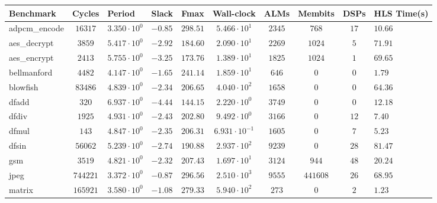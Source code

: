 \begin{tabular}{|l|c|HHc|c|c|c|cH|}
\hline
Benchmark     & Cycles       & Period                 & Slack     & Fmax       & Wall-clock              & ALMs      & Membits    & DSPs    & HLS Time(s) \\
\hline
adpcm\_encode & $ 16317    $ & $ 3.350 \cdot 10^{0} $ & $ -0.85 $ & $ 298.51 $ & $ 5.466 \cdot 10^{1}  $ & $ 2345  $ & $ 768    $ & $ 17  $ & $ 10.66   $ \\
aes\_decrypt  & $ 3859     $ & $ 5.417 \cdot 10^{0} $ & $ -2.92 $ & $ 184.60 $ & $ 2.090 \cdot 10^{1}  $ & $ 2269  $ & $ 1024   $ & $ 5   $ & $ 71.91   $ \\
aes\_encrypt  & $ 2413     $ & $ 5.755 \cdot 10^{0} $ & $ -3.25 $ & $ 173.76 $ & $ 1.389 \cdot 10^{1}  $ & $ 1825  $ & $ 1024   $ & $ 1   $ & $ 69.65   $ \\
bellmanford   & $ 4482     $ & $ 4.147 \cdot 10^{0} $ & $ -1.65 $ & $ 241.14 $ & $ 1.859 \cdot 10^{1}  $ & $ 646   $ & $ 0      $ & $ 0   $ & $ 1.79    $ \\
blowfish      & $ 83486    $ & $ 4.839 \cdot 10^{0} $ & $ -2.34 $ & $ 206.65 $ & $ 4.040 \cdot 10^{2}  $ & $ 1658  $ & $ 0      $ & $ 0   $ & $ 64.36   $ \\
dfadd         & $ 320      $ & $ 6.937 \cdot 10^{0} $ & $ -4.44 $ & $ 144.15 $ & $ 2.220 \cdot 10^{0}  $ & $ 3749  $ & $ 0      $ & $ 0   $ & $ 12.18   $ \\
dfdiv         & $ 1925     $ & $ 4.931 \cdot 10^{0} $ & $ -2.43 $ & $ 202.80 $ & $ 9.492 \cdot 10^{0}  $ & $ 3166  $ & $ 0      $ & $ 12  $ & $ 7.40    $ \\
dfmul         & $ 143      $ & $ 4.847 \cdot 10^{0} $ & $ -2.35 $ & $ 206.31 $ & $ 6.931 \cdot 10^{-1} $ & $ 1605  $ & $ 0      $ & $ 7   $ & $ 5.23    $ \\
dfsin         & $ 56062    $ & $ 5.239 \cdot 10^{0} $ & $ -2.74 $ & $ 190.88 $ & $ 2.937 \cdot 10^{2}  $ & $ 9239  $ & $ 0      $ & $ 28  $ & $ 81.47   $ \\
gsm           & $ 3519     $ & $ 4.821 \cdot 10^{0} $ & $ -2.32 $ & $ 207.43 $ & $ 1.697 \cdot 10^{1}  $ & $ 3124  $ & $ 944    $ & $ 48  $ & $ 20.24   $ \\
jpeg          & $ 744221   $ & $ 3.372 \cdot 10^{0} $ & $ -0.87 $ & $ 296.56 $ & $ 2.510 \cdot 10^{3}  $ & $ 9555  $ & $ 441608 $ & $ 26  $ & $ 68.95   $ \\
matrix        & $ 165921   $ & $ 3.580 \cdot 10^{0} $ & $ -1.08 $ & $ 279.33 $ & $ 5.940 \cdot 10^{2}  $ & $ 273   $ & $ 0      $ & $ 2   $ & $ 1.23    $ \\

\end{tabular}
